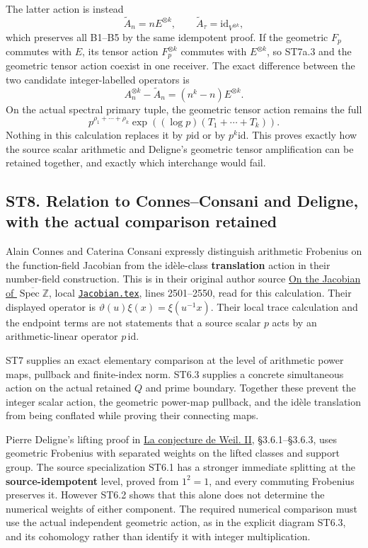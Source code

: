 The latter action is instead \[
 \widetilde A_n=nE^{\otimes k},\qquad
 \widetilde A_\tau=\mathrm{id}_{V^{\otimes k}},
\tag{ST7a.3}
\] which preserves all B1--B5 by the same idempotent proof. If the
geometric \(F_p\) commutes with \(E\), its tensor action
\(F_p^{\otimes k}\) commutes with \(E^{\otimes k}\), so ST7a.3 and the
geometric tensor action coexist in one receiver. The exact difference
between the two candidate integer-labelled operators is \[
 A_n^{\otimes k}-\widetilde A_n
 =(n^k-n)E^{\otimes k}.
\tag{ST7a.4}
\] On the actual spectral primary tuple, the geometric tensor action
remains the full \[
 p^{\rho_1+\cdots+\rho_k}
 \exp\!\left((\log p)(T_1+\cdots+T_k)\right).
\tag{ST7a.5}
\] Nothing in this calculation replaces it by \(p\mathrm{id}\) or by
\(p^k\mathrm{id}\). This proves exactly how the source scalar arithmetic
and Deligne's geometric tensor amplification can be retained together,
and exactly which interchange would fail.

\subsection{ST8. Relation to Connes--Consani and Deligne, with the
actual comparison
retained}\label{st8.-relation-to-connesconsani-and-deligne-with-the-actual-comparison-retained}

Alain Connes and Caterina Consani expressly distinguish arithmetic
Frobenius on the function-field Jacobian from the idèle-class
\textbf{translation} action in their number-field construction. This is
in their original author source
\href{https://arxiv.org/abs/2602.15941v1}{On the Jacobian of
\(\overline{\operatorname{Spec}\mathbb Z}\)}, local
\href{https://arxiv.org/abs/2602.15941v1}{\nolinkurl{Jacobian.tex}}, lines 2501--2550, read for
this calculation. Their displayed operator is
\(\vartheta(u)\xi(x)=\xi(u^{-1}x)\). Their local trace calculation and
the endpoint terms are not statements that a source scalar \(p\) acts by
an arithmetic-linear operator \(p\,\mathrm{id}\).

ST7 supplies an exact elementary comparison at the level of arithmetic
power maps, pullback and finite-index norm. ST6.3 supplies a concrete
simultaneous action on the actual retained \(Q\) and prime boundary.
Together these prevent the integer scalar action, the geometric
power-map pullback, and the idèle translation from being conflated while
proving their connecting maps.

Pierre Deligne's lifting proof in
\href{https://www.numdam.org/item/PMIHES_1980__52__137_0/}{La conjecture
de Weil. II}, §3.6.1--§3.6.3, uses geometric Frobenius with separated
weights on the lifted classes and support group. The source
specialization ST6.1 has a stronger immediate splitting at the
\textbf{source-idempotent} level, proved from \(1^2=1\), and every
commuting Frobenius preserves it. However ST6.2 shows that this alone
does not determine the numerical weights of either component. The
required numerical comparison must use the actual independent geometric
action, as in the explicit diagram ST6.3, and its cohomology rather than
identify it with integer multiplication.

